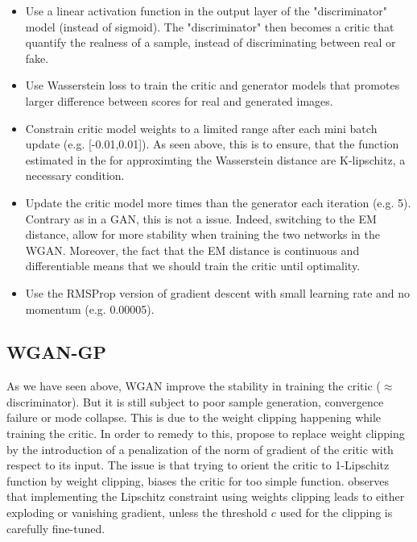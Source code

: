 \documentclass{article}
\begin{document}
\begin{itemize}
    \item Use a linear activation function in the output layer of the "discriminator" model (instead of sigmoid). The "discriminator" then becomes a critic that quantify the realness of a sample, instead of discriminating between real or fake.
    \item Use Wasserstein loss to train the critic and generator models that promotes larger difference between scores for real and generated images. 
    \item Constrain critic model weights to a limited range after each mini batch update (e.g. [-0.01,0.01]). As seen above, this is to ensure, that the function estimated in the for approximting the Wasserstein distance are K-lipschitz, a necessary condition.
    \item Update the critic model more times than the generator each iteration (e.g. 5). Contrary as in a GAN, this is not a issue. Indeed, switching to the EM distance, allow for more stability when training the two networks in the WGAN. Moreover, the fact that the EM distance is continuous and differentiable means that we should train the critic until optimality.
    \item Use the RMSProp version of gradient descent with small learning rate and no momentum (e.g. 0.00005).
    
\end{itemize}



\subsection{WGAN-GP}

As we have seen above, WGAN improve the stability in training the critic ($\approx$ discriminator). But it is still subject to poor sample generation, convergence failure or mode collapse. This is due to the weight clipping happening while training the critic. In order to remedy to this, \cite{DBLP:journals/corr/GulrajaniAADC17} propose to replace weight clipping by the introduction of a penalization of the norm of gradient of the critic with respect to its input. The issue is that trying to orient the critic to 1-Lipschitz function by weight clipping, biases the critic for too simple function. \cite{DBLP:journals/corr/GulrajaniAADC17} observes that implementing the Lipschitz constraint using weights clipping leads to either exploding or vanishing gradient, unless the threshold $c$ used for the clipping is carefully fine-tuned.
\end{document}
